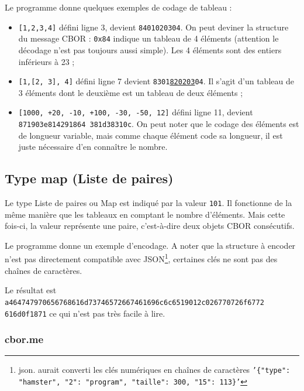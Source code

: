 Le programme  donne quelques exemples de codage de tableau :
\begin{itemize}
    \item \texttt{[1,2,3,4]} défini ligne 3, devient \texttt{8401020304}. On peut deviner la structure du message CBOR : \texttt{0x84} indique un tableau de 4 éléments (attention le décodage n'est pas toujours aussi simple). Les 4 éléments sont des entiers inférieurs à 23 ;
    \item \texttt{[1,[2, 3], 4]} défini ligne 7 devient \texttt{8301\ul{820203}04}. Il s'agit d'un tableau de 3 éléments dont le deuxième est un tableau de deux éléments ;
    \item \texttt{[1000, +20, -10, +100, -30, -50, 12]} défini ligne 11, devient \texttt{871903e814291864 381d38310c}. On peut noter que le codage des éléments est de longueur variable, mais comme chaque élément code sa longueur, il est juste nécessaire d'en connaître le nombre.
\end{itemize}

\subsection{Type map (Liste de paires)}



Le type Liste de paires ou Map est indiqué par la valeur \texttt{101}. Il fonctionne de la même manière que les tableaux en comptant le nombre d'éléments. Mais cette fois-ci, la valeur représente une paire, c'est-à-dire deux objets CBOR consécutifs.


Le programme  donne un exemple d'encodage. A noter que la structure à encoder n'est pas directement compatible avec JSON\footnote{json. aurait converti les clés numériques en chaînes de caractères \texttt{'\{"type": "hamster", "2": "program", "taille": 300, "15": 113\}'}}, certaines clés ne sont pas des chaînes de caractères.

       \vspace{1em}


Le résultat est \texttt{a464747970656768616d73746572667461696c6c6519012c026770726f6772 616d0f1871} ce qui n'est pas très facile à lire. 


\subsubsection{cbor.me}

